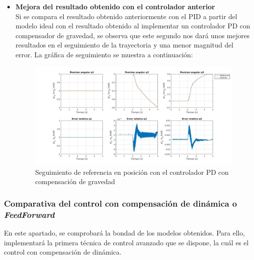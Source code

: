 \begin{itemize}
	
	\item \textbf{Mejora del resultado obtenido con el controlador anterior} \\
	
	Si se compara el resultado obtenido anteriormente con el PID a partir del modelo ideal con el resultado obtenido al implementar un controlador PD con compensador de gravedad, se observa que este segundo nos dará unos mejores resultados en el seguimiento de la trayectoria y una menor magnitud del error. La gráfica de seguimiento se muestra a continuación:
	
	
	
	\begin{figure}[h!]
		
		\centering
		
		\includegraphics[width=.8\textwidth]{exp2_posPDcomp}
		
		\caption{Seguimiento de referencia en posición con el controlador PD con compensación de gravedad}
		
	\end{figure}
	
	
	
	
\end{itemize}



\subsubsection{Comparativa del control con compensación de dinámica o \textit{FeedForward}}

En este apartado, se comprobará la bondad de los modelos obtenidos. Para ello, implementará la primera técnica de control avanzado que se dispone, la cuál es el control con compensación de dinámica.\\

